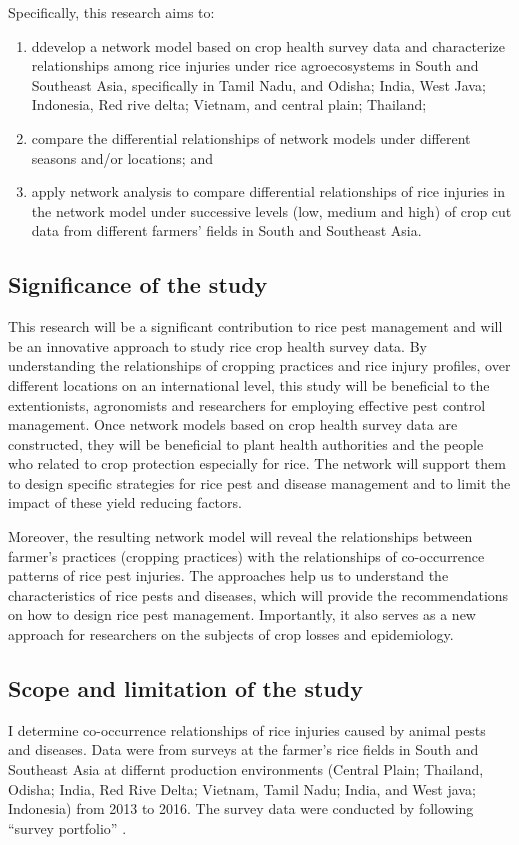 Specifically, this research aims to:
\begin{enumerate}
\item ddevelop a network model based on crop health survey data and characterize relationships among rice injuries under rice agroecosystems in South and Southeast Asia, specifically in Tamil Nadu, and Odisha; India, West Java; Indonesia, Red rive delta; Vietnam, and central plain; Thailand;
\item compare the differential relationships of network models under different seasons and/or locations; and
\item apply network analysis to compare differential relationships of rice injuries in the network model under successive levels (low, medium and high) of crop cut data from different farmers' fields in South and Southeast Asia.
\end{enumerate}

\subsection{Significance of the study}

This research will be a significant contribution to rice pest management and will be an innovative approach to study rice crop health survey data. By understanding the relationships of cropping practices and rice injury profiles, over different locations on an international level, this study will be beneficial to the extentionists, agronomists and researchers for employing effective pest control management. Once network models based on crop health survey data are constructed, they will be beneficial to plant health authorities and the people who related to crop protection especially for rice. The network will support them to design specific strategies for rice pest and disease management and to limit the impact of these yield reducing factors. 

Moreover, the resulting network model will reveal the relationships between farmer’s practices (cropping practices) with the relationships of co-occurrence patterns of rice pest injuries. The approaches help us to understand the characteristics of  rice pests and diseases, which will provide the recommendations on how to design rice pest management. Importantly, it also serves as a new approach for researchers on the subjects of crop losses and epidemiology. 

\subsection{Scope and limitation of the study}

I determine co-occurrence relationships of rice injuries caused by animal pests and diseases. Data were from  surveys at the farmer's rice fields in South and Southeast Asia at differnt production environments (Central Plain; Thailand, Odisha; India, Red Rive Delta; Vietnam, Tamil Nadu; India, and West java; Indonesia) from 2013 to 2016. The survey data were conducted by following ``survey portfolio'' \citep{Savary_2009_Survey}.
